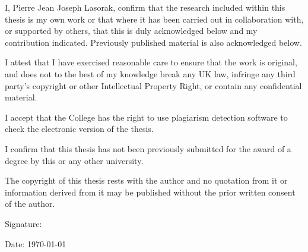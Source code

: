 
I, Pierre Jean Joseph Lasorak, confirm that the research included
within this thesis is my own work or that where it has been carried
out in collaboration with, or supported by others, that this is duly
acknowledged below and my contribution indicated. Previously published
material is also acknowledged below.

I attest that I have exercised reasonable care to ensure that the work
is original, and does not to the best of my knowledge break any UK
law, infringe any third party’s copyright or other Intellectual
Property Right, or contain any confidential material.

I accept that the College has the right to use plagiarism detection
software to check the electronic version of the thesis.

I confirm that this thesis has not been previously submitted for the
award of a degree by this or any other university.

The copyright of this thesis rests with the author and no quotation
from it or information derived from it may be published without the
prior written consent of the author.

\vspace{1cm}

Signature:
\vspace{3cm}

Date: \today

